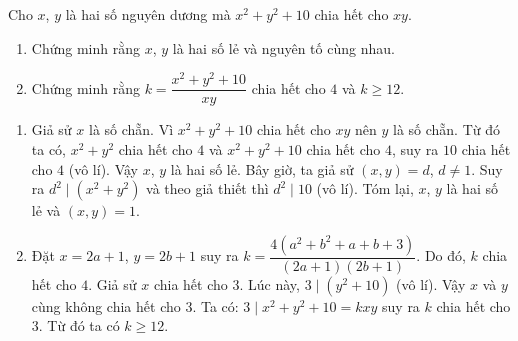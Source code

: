 \begin{ex}
	Cho $x$, $y$ là hai số nguyên dương mà $x^2+y^2+10$ chia hết cho $xy$.
	\begin{enumerate}    
		\item Chứng minh rằng $x$, $y$ là hai số lẻ và nguyên tố cùng nhau.
		\item Chứng minh rằng $k=\dfrac{x^2+y^2+10}{xy}$ chia hết cho $4$ và $k\geq 12$.
	\end{enumerate}
	\loigiai
	{
		\begin{enumerate}
			\item Giả sử $x$ là số chẵn. Vì $x^2+y^2+10$ chia hết cho $xy$ nên $y$ là số chẵn. Từ đó ta có, $x^2+y^2$ chia hết cho $4$ và $x^2+y^2+10$ chia hết cho $4$, suy ra $10$ chia hết cho $4$ (vô lí). Vậy $x$, $y$ là hai số lẻ. Bây giờ, ta giả sử $(x,y)=d$, $d\neq 1$. Suy ra $d^2\mid(x^2+y^2)$ và theo giả thiết thì $d^2\mid 10$ (vô lí). Tóm lại, $x$, $y$ là hai số lẻ và $(x,y)=1$.
			
			\item Đặt $x=2a+1$, $y=2b+1$ suy ra $k=\dfrac{4(a^2+b^2+a+b+3)}{(2a+1)(2b+1)}$. Do đó, $k$ chia hết cho $4$. Giả sử $x$ chia hết cho $3$. Lúc này, $3\mid(y^2+10)$ (vô lí). Vậy $x$ và $y$ cùng không chia hết cho 3. Ta có: $3\mid x^2+y^2+10=kxy$ suy ra $k$ chia hết cho 3. Từ đó ta có $k\geq 12$.
		\end{enumerate}
	}
\end{ex}	
